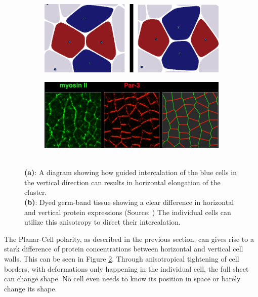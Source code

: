 \begin{figure}[H]
    \centering
    \begin{subfigure}{0.45\linewidth}
        \centering
    \includegraphics[width=\linewidth]{chapters/Theory/figures/ConvergentExtensionDiagram.png}
    \caption{}
    \label{fig:cellIntercolation}
    \end{subfigure}
        \begin{subfigure}{0.45\linewidth}
        \centering
    \includegraphics[width=\linewidth]{chapters/Theory/figures/bipolar-PCP.png}
        \caption{}
    \label{fig:dyedDifferentialWall}
    \end{subfigure}
    \caption{\\\textbf{(a)}: A diagram showing how guided intercalation of the blue cells in the vertical direction can results in horizontal elongation of the cluster. \\\textbf{(b)}: Dyed germ-band tissue showing a clear difference in horizontal and vertical protein expressions (Source: ) The individual cells can utilize this anisotropy to direct their intercalation.}
    
    \label{fig:ConvergentExtensionDiagram}
\end{figure}

The Planar-Cell polarity, as described in the previous section, can gives rise to a stark difference of protein concentrations between horizontal and vertical cell walls. This can be seen in Figure \ref{fig:dyedDifferentialWall}.
Through anisotropical tightening of cell borders, with deformations only happening in the individual cell, the full sheet can change shape. No cell even needs to know its position in space or barely change its shape. 

